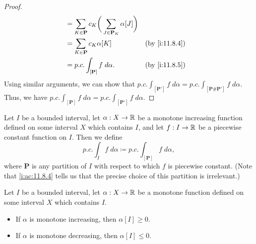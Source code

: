 \begin{proof}
\begin{align*}
                                                          & = \sum_{K \in \mathbf{P}} c_K \bigg(\sum_{J \in \mathbf{P}_K} \alpha[J]\bigg)                                      \\
                                                          & = \sum_{K \in \mathbf{P}} c_K \alpha[K]                                       &                 & \by{i:11.8.4}    \\
                                                          & = p.c. \int_{[\mathbf{P}]} f \; d \alpha.                                     &                 & \by{i:11.8.5}
  \end{align*}
  Using similar arguments, we can show that \(p.c. \int_{[\mathbf{P}']} f \; d \alpha = p.c. \int_{[\mathbf{P} \# \mathbf{P}']} f \; d \alpha\).
  Thus, we have \(p.c. \int_{[\mathbf{P}]} f \; d \alpha = p.c. \int_{[\mathbf{P}']} f \; d \alpha\).
\end{proof}

\begin{ac}\label{i:ac:11.8.5}
  Let \(I\) be a bounded interval, let \(\alpha : X \to \mathbb{R}\) be a monotone increasing function defined on some interval \(X\) which contains \(I\), and let \(f : I \to \mathbb{R}\) be a piecewise constant function on \(I\).
  Then we define
  \[
    p.c. \int_I f \; d \alpha \coloneqq p.c. \int_{[\mathbf{P}]} f \; d \alpha,
  \]
  where \(\mathbf{P}\) is any partition of \(I\) with respect to which \(f\) is piecewise constant.
  (Note that \cref{i:ac:11.8.4} tells us that the precise choice of this partition is irrelevant.)
\end{ac}

\begin{ac}\label{i:ac:11.8.6}
  Let \(I\) be a bounded interval, let \(\alpha : X \to \mathbb{R}\) be a monotone function defined on some interval \(X\) which contains \(I\).
  \begin{itemize}
    \item If \(\alpha\) is monotone increasing, then \(\alpha[I] \geq 0\).
    \item If \(\alpha\) is monotone decreasing, then \(\alpha[I] \leq 0\).
  \end{itemize}
\end{ac}

